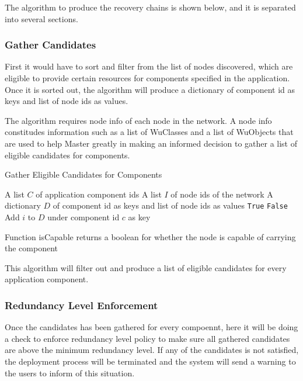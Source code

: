 The algorithm to produce the recovery chains is shown below, and it is
separated into several sections.

\subsubsection{Gather Candidates}

First it would have to sort and filter from the list of nodes discovered, which
are eligible to provide certain resources for components specified in the
application. Once it is sorted out, the algorithm will produce a dictionary of
component id as keys and list of node ids as values.

The algorithm requires node info of each node in the network. A node info
constitudes information such as a list of WuClasses and a list of WuObjects
that are used to help Master greatly in making an informed decision to gather
a list of eligible candidates for components.

\begin{algorithm}
\caption{Gather Eligible Candidates for Components}
\label{alg:recovery-chain}
\begin{algorithmic}
\Require A list $C$ of application component ids
\Require A list $I$ of node ids of the network
\Ensure A dictionary $D$ of component id as keys and list of node ids as values
    \State \Return \texttt{True}
  \Else
    \State \Return \texttt{False}
  \EndIf
\EndFunction
{}
      \State Add $i$ to $D$ under component id $c$ as key
    \EndIf
  \EndFor
\EndFor
\end{algorithmic}
\end{algorithm}

Function isCapable returns a boolean for whether the node is capable of
carrying the component

This algorithm will filter out and produce a list of eligible candidates for
every application component.

\subsubsection{Redundancy Level Enforcement}

Once the candidates has been gathered for every compoennt, here it will be
doing a check to enforce redundancy level policy to make sure all gathered
candidates are above the minimum redundancy level. If any of the candidates is
not satisfied, the deployment process will be terminated and the system will
send a warning to the users to inform of this situation.


